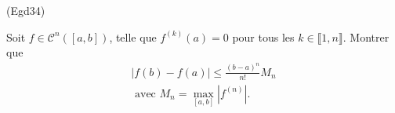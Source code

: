 \begin{tiny}(Egd34)\end{tiny} Soit $f\in \mathcal{C}^{n}(\left[ a,b\right] )$, telle que $f^{(k)}(a)=0$ pour tous les $k\in \llbracket 1,n \rrbracket$. Montrer que
\begin{multline*}
 \left|f(b) - f(a)\right| \leq \frac{(b-a)^n}{n!}M_n \\
 \text{ avec } M_n = \max_{\left[a,b \right] }\left|f^{(n)}\right|.
\end{multline*}
